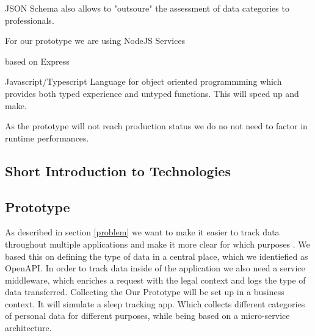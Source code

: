 JSON Schema also allows to "outsoure" the assessment of data categories to professionals. 




For our prototype we are using NodeJS Services

based on Express 

Javascript/Typescript Language for object oriented programmming which provides both typed experience and untyped functions. This will speed up and make. 

As the prototype will not reach production status we do no not need to factor in runtime performances. 

\subsection{Short Introduction to Technologies}









\subsection{Prototype}

As described in section \ref{problem} we want to make it easier to track data throughout multiple applications and make it more clear for which purposes . 
We based this on defining the type of data in a central place, which we identiefied as OpenAPI. In order to track data inside of the application we also need a service middleware, which enriches a request with the legal context and logs the type of data transferred. 
Collecting the 
Our Prototype will be set up in a business context. It will simulate a sleep tracking app. Which collects different categories of personal data for different purposes, while being based on a micro-service architecture. 

